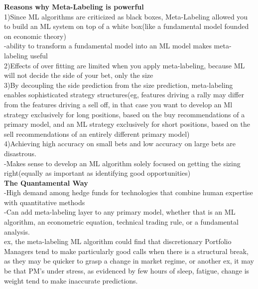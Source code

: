 \documentclass{article}
\begin{document}
\textbf{Reasons why Meta-Labeling is powerful}\\ 
1)Since ML algorithms are criticized as black boxes, Meta-Labeling allowed you to build an ML system on top of a white box(like a fundamental model founded on economic theory)\\ 
	\indent-ability to transform a fundamental model into an ML model makes meta-		labeling useful\\ 
2)Effects of over fitting are limited when you apply meta-labeling, because ML will not decide the side of your bet, only the size\\ 
3)By decoupling the side prediction from the size prediction, meta-labeling enables sophisticated strategy structures(eg, features driving a rally may differ from the features driving a sell off, in that case you want to develop an Ml strategy exclusively for long positions, based on the buy recommendations of a primary model, and an ML strategy exclusively for short positions, based on the sell recommendations of an entirely different primary model)\\ 
4)Achieving high accuracy on small bets and low accuracy on large bets are disastrous.\\ 
-Makes sense to develop an ML algorithm solely focused on getting the sizing right(equally as important as identifying good opportunities)\\ 

\textbullet\textbf{The Quantamental Way}\\ 
-High demand among hedge funds for technologies that combine human expertise with quantitative methods\\ 
-Can add meta-labeling layer to any primary model, whether that is an ML algorithm, an econometric equation, technical trading rule, or a fundamental analysis.\\ 
ex, the meta-labeling ML algorithm could find that discretionary Portfolio Managers tend to make particularly good calls when there is a structural break, as they may be quicker to grasp a change in market regime, or another ex, it may be that PM's under stress, as evidenced by few hours of sleep, fatigue, change is weight tend to make inaccurate predictions. \\ 
\end{document}
